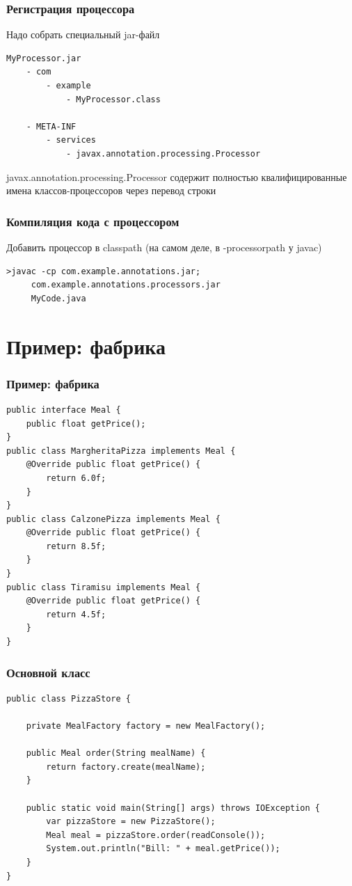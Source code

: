 \documentclass[xetex,mathserif,serif]{beamer}
\begin{document}
	\begin{frame}[fragile]
		\frametitle{Регистрация процессора}
		Надо собрать специальный jar-файл
		\begin{verbatim}
MyProcessor.jar
    - com
        - example
            - MyProcessor.class

    - META-INF
        - services
            - javax.annotation.processing.Processor
		\end{verbatim}
		javax.annotation.processing.Processor содержит полностью квалифицированные имена классов-процессоров через перевод строки
	\end{frame}

	\begin{frame}[fragile]
		\frametitle{Компиляция кода с процессором}
		Добавить процессор в classpath (на самом деле, в -processorpath у javac)
		\vspace{1cm}
		\begin{verbatim}
>javac -cp com.example.annotations.jar;
     com.example.annotations.processors.jar
     MyCode.java
		\end{verbatim}
	\end{frame}

	\section{Пример: фабрика}

		\begin{frame}[fragile]
		\frametitle{Пример: фабрика}
		\begin{footnotesize}
			\begin{verbatim}
public interface Meal {
    public float getPrice();
}
public class MargheritaPizza implements Meal {
    @Override public float getPrice() {
        return 6.0f;
    }
}
public class CalzonePizza implements Meal {
    @Override public float getPrice() {
        return 8.5f;
    }
}
public class Tiramisu implements Meal {
    @Override public float getPrice() {
        return 4.5f;
    }
}
			\end{verbatim}
		\end{footnotesize}
	\end{frame}

	\begin{frame}[fragile]
		\frametitle{Основной класс}
		\begin{small}
			\begin{verbatim}
public class PizzaStore {

    private MealFactory factory = new MealFactory();

    public Meal order(String mealName) {
        return factory.create(mealName);
    }

    public static void main(String[] args) throws IOException {
        var pizzaStore = new PizzaStore();
        Meal meal = pizzaStore.order(readConsole());
        System.out.println("Bill: " + meal.getPrice());
    }
}
			\end{verbatim}
		\end{small}
	\end{frame}
\end{document}
